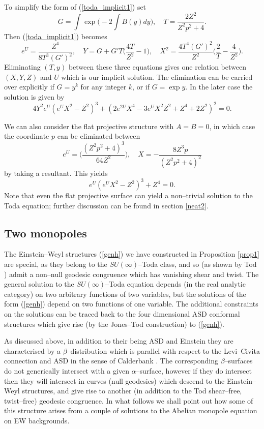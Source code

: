 To simplify the form of (\ref{toda_implicit1}) set
\[
G=\int\exp{\Big(-2\int B(y)dy\Big)}, \quad T=\frac{2Z^2}{Z^2p^2+4}.
\]
Then (\ref{toda_implicit1}) becomes
\[
e^U=\frac{Z^4}{8T^3 (G')^2}, \quad Y=G+G'T\Big(\frac{4T}{Z^2}-1\Big), \quad
X^2=\frac{4T^4(G')^2}{Z^2}\Big(\frac{2}{T}-\frac{4}{Z^2} \Big).
\]
Eliminating $(T, y)$ between these three equations gives one relation between $(X, Y, Z)$ and  $U$ which is our implicit solution.
The elimination can be carried over explicitly if $G=y^k$ for any integer $k$, or if $G=\exp{y}$. In the later case the solution is given by
\[
4Y^2e^U(e^UX^2-Z^2)^3+(2e^{2U}X^4-3e^UX^2Z^2+Z^4+2Z^2)^2=0.
\]

We can also consider the flat projective structure with $A=B=0$, in which case
the coordinate $p$ can be eliminated between
\[
e^U=\bigg(\frac{(Z^2p^2+4)^3}{64Z^2}\bigg), \quad
X=-\frac{8Z^3p}{(Z^2p^2+4)^2}
\]
by taking a resultant. This yields
\[
e^U(e^UX^2-Z^2)^3+Z^4=0.
\]
Note that even the flat projective surface can yield a non--trivial solution to the Toda equation; further discussion can be found in section \ref{neat2}.


\subsection{Two monopoles}
The Einstein--Weyl structures  (\ref{genh}) we have constructed in Proposition \ref{prop1}
are special, as they belong to the $SU(\infty)$--Toda class, and so
(as shown by Tod \cite{Tod_toda}) admit a non--null geodesic congruence which has vanishing shear and twist.
The general solution to the $SU(\infty)$--Toda equation depends (in the real analytic category) on 
two arbitrary functions of two variables, but the solutions of the form (\ref{genh}) depend on two functions of one variable. The additional constraints on the solutions can be traced back to the four dimensional ASD conformal structures
which give rise (by the Jones--Tod construction) to (\ref{genh}).

As discussed above, in addition to their being ASD and Einstein
they are  characterised \cite{DM} by a $\beta$--distribution which is parallel with respect to the Levi--Civita connection and ASD in the sense of Calderbank \cite{Cal1}.
The corresponding $\beta$--surfaces do not generically intersect with a given $\alpha$--surface, however if they do intersect then they will intersect in curves (null geodesics) which descend to the Einstein--Weyl structures, and give
rise to another (in addition to the Tod shear--free, twist--free) geodesic congruence.
In what follows we shall point out how some of this structure arises from a couple of solutions to the Abelian monopole
equation on EW  backgrounds.






